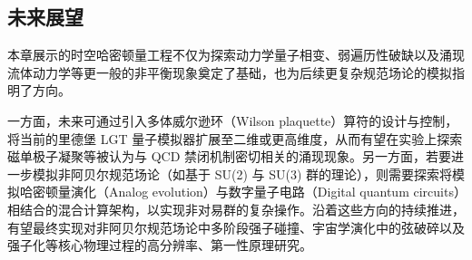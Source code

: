 \documentclass[../main.tex]{subfiles}
\begin{document}
\subsection{未来展望}
本章展示的时空哈密顿量工程不仅为探索动力学量子相变、弱遍历性破缺以及涌现流体动力学等更一般的非平衡现象奠定了基础，也为后续更复杂规范场论的模拟指明了方向。

一方面，未来可通过引入多体威尔逊环（Wilson plaquette）算符的设计与控制，将当前的里德堡 LGT 量子模拟器扩展至二维或更高维度，从而有望在实验上探索磁单极子凝聚等被认为与 QCD 禁闭机制密切相关的涌现现象。另一方面，若要进一步模拟非阿贝尔规范场论（如基于 SU(2) 与 SU(3) 群的理论），则需要探索将模拟哈密顿量演化（Analog evolution）与数字量子电路（Digital quantum circuits）相结合的混合计算架构，以实现非对易群的复杂操作。沿着这些方向的持续推进，有望最终实现对非阿贝尔规范场论中多阶段强子碰撞、宇宙学演化中的弦破碎以及强子化等核心物理过程的高分辨率、第一性原理研究。




\end{document}
